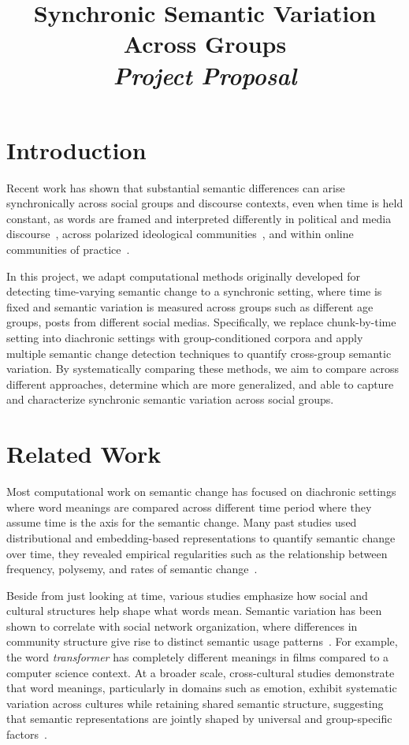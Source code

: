 \documentclass[conference]{IEEEtran}
\title{
{Synchronic Semantic Variation Across Groups}\\[0.2em]
\large \textit{Project Proposal} \\[-1em]
}
\author{
\IEEEauthorblockN{Johnny Meng, Yimo Ning}
\IEEEauthorblockA{
\texttt{\{johnnymeng, yimoning\}@cs.toronto.edu}
}
}
\begin{document}
\setlength{\parindent}{0pt}
\maketitle

\section{Introduction}

Recent work has shown that substantial semantic differences can arise synchronically across social groups and discourse contexts, even when time is held constant, as words are framed and interpreted differently in political and media discourse~\cite{azarbonyad2017words}, across polarized ideological communities~\cite{khudabukhsh2021we}, and within online communities of practice~\cite{del2017semantic}.

In this project, we adapt computational methods originally developed for detecting time-varying semantic change to a synchronic setting, where time is fixed and semantic variation is measured across groups such as different age groups, posts from different social medias. Specifically, we replace chunk-by-time setting into diachronic settings with group-conditioned corpora and apply multiple semantic change detection techniques to quantify cross-group semantic variation. By systematically comparing these methods, we aim to compare across different approaches, determine which are more generalized, and able to capture and characterize synchronic semantic variation across social groups.

\section{Related Work}

Most computational work on semantic change has focused on diachronic settings where word meanings are compared across different time period where they assume time is the axis for the semantic change. Many past studies used distributional and embedding-based representations to quantify semantic change over time, they revealed empirical regularities such as the relationship between frequency, polysemy, and rates of semantic change~\cite{hamilton2016diachronic}. 

Beside from just looking at time, various studies emphasize how social and cultural structures help shape what words mean. Semantic variation has been shown to correlate with social network organization, where differences in community structure give rise to distinct semantic usage patterns~\cite{noble2021semantic}. For example, the word \textit{transformer} has completely different meanings in films compared to a computer science context. At a broader scale, cross-cultural studies demonstrate that word meanings, particularly in domains such as emotion, exhibit systematic variation across cultures while retaining shared semantic structure, suggesting that semantic representations are jointly shaped by universal and group-specific factors~\cite{jackson2019emotion}.
\end{document}
